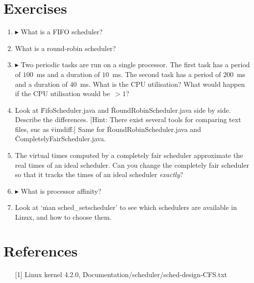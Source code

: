\section*{Exercises}

\begin{enumerate}
\item
  $\blacktriangleright$
  What is a FIFO scheduler?
\item
  What is a round-robin scheduler?
\item
  $\blacktriangleright$
  Two periodic tasks are run on a single processor.
  The first task has a period of $100$~ms and a duration of $10$~ms.
  The second task has a period of $200$~ms and a duration of $40$~ms.
  What is the CPU utilisation?
  What would happen if the CPU utilisation would be~$>1$?
\item
  Look at \.{FifoScheduler.java} and \.{RoundRobinScheduler.java} side by side.
  Describe the differences.
  [Hint: There exist several tools for comparing text files, suc as \.{vimdiff}.]
  Same for \.{RoundRobinScheduler.java} and \.{CompletelyFairScheduler.java}.
\item
  The virtual times computed by a completely fair scheduler
    approximate the real times of an ideal scheduler.
  Can you change the completely fair scheduler
    so that it tracks the times of an ideal scheduler \emph{exactly}?
\item
  $\blacktriangleright$
  What is processor affinity?
\item
  Look at `\.{man sched\_setscheduler}'
    to see which schedulers are available in Linux,
  and how to choose them.
\end{enumerate}

\section*{References}

\begin{itemize}
\item[{[1]}]
  Linux kernel 4.2.0, \.{Documentation/scheduler/sched-design-CFS.txt}
\end{itemize}




